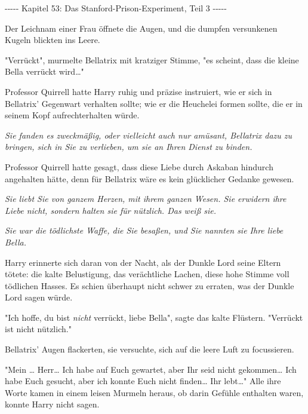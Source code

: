

\hypertarget{das-stanford-prison-experiment-teil-3}{%

-\/-\/-\/-\/- Kapitel 53: Das Stanford-Prison-Experiment, Teil 3 -\/-\/-\/-\/-

Der Leichnam einer Frau öffnete die Augen, und die dumpfen versunkenen Kugeln blickten ins Leere.

"Verrückt", murmelte Bellatrix mit kratziger Stimme, "es scheint, dass die kleine Bella verrückt wird…"

Professor Quirrell hatte Harry ruhig und präzise instruiert, wie er sich in Bellatrix' Gegenwart verhalten sollte; wie er die Heuchelei formen sollte, die er in seinem Kopf aufrechterhalten würde.

\emph{\emph{Sie fanden es zweckmäßig, oder vielleicht auch nur amüsant, Bellatrix dazu zu bringen, sich in Sie zu verlieben, um sie an Ihren Dienst zu binden.}}

Professor Quirrell hatte gesagt, dass diese Liebe durch Askaban hindurch angehalten hätte, denn für Bellatrix wäre es kein glücklicher Gedanke gewesen.

\emph{\emph{Sie liebt Sie von ganzem Herzen, mit ihrem ganzen Wesen. Sie erwidern ihre Liebe nicht, sondern halten sie für nützlich. Das weiß sie.}}

\emph{Sie war die tödlichste Waffe, die Sie besaßen, und Sie nannten sie Ihre liebe Bella.}

Harry erinnerte sich daran von der Nacht, als der Dunkle Lord seine Eltern tötete: die kalte Belustigung, das verächtliche Lachen, diese hohe Stimme voll tödlichen Hasses. Es schien überhaupt nicht schwer zu erraten, was der Dunkle Lord sagen würde.

"Ich hoffe, du bist \emph{nicht} verrückt, liebe Bella", sagte das kalte Flüstern. "Verrückt ist nicht nützlich."

Bellatrix' Augen flackerten, sie versuchte, sich auf die leere Luft zu focussieren.

"Mein … Herr… Ich habe auf Euch gewartet, aber Ihr seid nicht gekommen… Ich habe Euch gesucht, aber ich konnte Euch nicht finden… Ihr lebt…" Alle ihre Worte kamen in einem leisen Murmeln heraus, ob darin Gefühle enthalten waren, konnte Harry nicht sagen.

}
